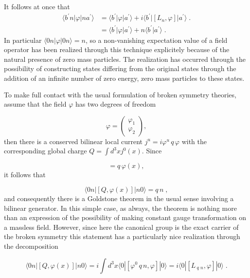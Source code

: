 \documentclass[%
  12pt,
  paper=letter,
  abstracton,
  pagesize=auto,
  version=last,
  DIV=calc
  ]{article}
\begin{document}
It follows at once that
\begin{align*}
\langle b^{\prime} n |\varphi| n a^{\prime}\rangle &= \langle b^{\prime} |\varphi
  |a^{\prime}\rangle + i \langle b^{\prime}| [L_n, \varphi]|a^{\prime}\rangle \;.\\
&= \langle b^{\prime} |\varphi |a^{\prime}\rangle + n \langle
  b^{\prime}|a^{\prime}\rangle \; .
\end{align*}
In particular $\langle 0 n | \varphi | 0 n\rangle = n$, so a non-vanishing
expectation value of a field operator has been realized through this
technique explicitely because of the natural presence of zero mass
particles.  The realization has occurred through the possibility of
constructing states differing from the original states through the
addition of an infinite number of zero energy, zero mass particles to
these states.

To make full contact with the usual formulation of broken symmetry
theories, assume that the field $\varphi$ has two degrees of freedom

\begin{equation*}
\varphi = \left( \begin{array}{c} \varphi_1\\ \varphi_2 \end{array} \right),
\end{equation*}
then there is a conserved bilinear local current $j^u = i \varphi^u\,
q\, \varphi$ with the corresponding global charge $Q = \int d^3 x j^0(x)$.  Since

\begin{equation*}
[Q, \varphi (x)] = q\, {\varphi (x)},
\end{equation*}
it follows that

\begin{equation*}
\langle 0 n | [Q, \varphi(x)] | n 0\rangle = q \,n \; ,
\end{equation*}
and consequently there is a Goldstone theorem in the usual sense
involving a bilinear generator.  In this simple case, as always, the
theorem is nothing more than an expression of the possibility of
making constant gauge transformation on a massless field.  However,
since here the canonical group is the exact carrier of the broken
symmetry this statement has a particularly nice realization through
the decomposition

\begin{equation*}
\langle 0 n | [Q, \varphi(x)] | n 0\rangle = i \int d^3 x \langle 0 | [ \varphi^{0}\, q\, n, \varphi] | 0\rangle
= i \langle 0 | [ L\,_q\,_n, \varphi ] | 0\rangle\;.
\end{equation*}
\end{document}
